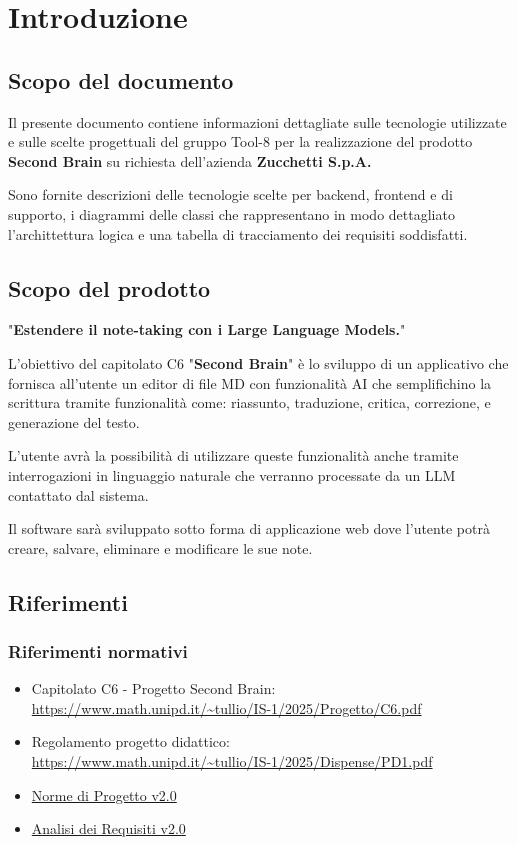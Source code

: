 \documentclass[a4paper,10pt]{article}
\begin{document}
\newpage

\tableofcontents

\newpage

\listoffigures

\newpage

\section{Introduzione}
\subsection{Scopo del documento}
Il presente documento contiene informazioni dettagliate sulle tecnologie utilizzate e sulle scelte progettuali del gruppo Tool-8 per la realizzazione del prodotto \textbf{Second Brain} su richiesta dell'azienda \textbf{Zucchetti S.p.A.}

Sono fornite descrizioni delle tecnologie scelte per backend, frontend e di supporto, i diagrammi delle classi che rappresentano in modo dettagliato l'archittettura logica e una tabella di tracciamento dei requisiti soddisfatti.

\subsection{Scopo del prodotto}
"\textbf{Estendere il note-taking con i Large Language Models.}"

L'obiettivo del capitolato C6 "\textbf{Second Brain}" è lo sviluppo di un applicativo che fornisca all'utente un editor di file MD con funzionalità AI che semplifichino la scrittura tramite funzionalità come: riassunto, traduzione, critica, correzione, e generazione del testo.

L'utente avrà la possibilità di utilizzare queste funzionalità anche tramite interrogazioni in linguaggio naturale che verranno processate da un LLM contattato dal sistema.

Il software sarà sviluppato sotto forma di applicazione web dove l'utente potrà creare, salvare, eliminare e modificare le sue note.

\subsection{Riferimenti}
\subsubsection{Riferimenti normativi}
\begin{itemize}
  \item Capitolato C6 - Progetto Second Brain: \\  \url{https://www.math.unipd.it/~tullio/IS-1/2025/Progetto/C6.pdf}
  \item Regolamento progetto didattico: \\ \url{https://www.math.unipd.it/~tullio/IS-1/2025/Dispense/PD1.pdf}
  \item \href{https://tool-8.github.io/Documentazione-SWE/pb/Norme_di_Progetto_v2.0.pdf}{Norme di Progetto v2.0}
  \item \href{https://tool-8.github.io/Documentazione-SWE/pb/Analisi_dei_Requisiti_v2.0.pdf}{Analisi dei Requisiti v2.0}
\end{itemize}
\end{document}
